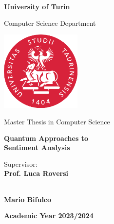 \begin{center}
{\LARGE \textbf{University of Turin}}
\vspace{0.2cm}

{\Large {Computer Science Department}} 
\vspace{1cm}

\includegraphics[width=4cm]{figures/unito-logo.png}
\vspace{0.8cm}

{\Large {Master Thesis in Computer Science}}
\vspace{1cm}

{\LARGE \textbf{Quantum Approaches to \\Sentiment Analysis}}
\vspace{1cm}

\end{center}

\noindent \large{Supervisor:} \\
\large{\textbf{Prof. Luca Roversi}} 
\vspace{1cm}



 \\
\large{\textbf{Mario Bifulco}} 

\vspace{2cm}

\begin{center}
    \large{\textbf{Academic Year 2023/2024}}
\end{center}


